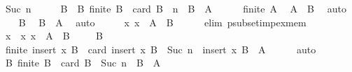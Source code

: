 \begin{isabellebody}
\ {\isacharparenleft}{\kern0pt}Suc\ n{\isacharparenright}{\kern0pt}\isanewline
\ \ \isamarkupfalse%
\ \isamarkupfalse%
\ B\ \ B{\isacharcolon}{\kern0pt}\ {\isachardoublequoteopen}finite\ B\ {\isasymand}\ card\ B\ {\isacharequal}{\kern0pt}\ n\ {\isasymand}\ B\ {\isasymsubseteq}\ A{\isachardoublequoteclose}\ \isacommand{{\isachardot}{\kern0pt}{\isachardot}{\kern0pt}}\isamarkupfalse%
\isanewline
\ \ \isamarkupfalse%
\ {\isacartoucheopen}{\isasymnot}\ finite\ A{\isacartoucheclose}\ \isamarkupfalse%
\ {\isachardoublequoteopen}A\ {\isasymnoteq}\ B{\isachardoublequoteclose}\ \isamarkupfalse%
\ auto\isanewline
\ \ \isamarkupfalse%
\ B\ \isamarkupfalse%
\ {\isachardoublequoteopen}B\ {\isasymsubset}\ A{\isachardoublequoteclose}\ \isamarkupfalse%
\ auto\isanewline
\ \ \isamarkupfalse%
\ \isamarkupfalse%
\ {\isachardoublequoteopen}{\isasymexists}x{\isachardot}{\kern0pt}\ x\ {\isasymin}\ A\ {\isacharminus}{\kern0pt}\ B{\isachardoublequoteclose}\isanewline
\ \ \ \ \isamarkupfalse%
\ {\isacharparenleft}{\kern0pt}elim\ psubset{\isacharunderscore}{\kern0pt}imp{\isacharunderscore}{\kern0pt}ex{\isacharunderscore}{\kern0pt}mem{\isacharparenright}{\kern0pt}\isanewline
\ \ \isamarkupfalse%
\ \isamarkupfalse%
\ x\ \ x{\isacharcolon}{\kern0pt}\ {\isachardoublequoteopen}x\ {\isasymin}\ A\ {\isacharminus}{\kern0pt}\ B{\isachardoublequoteclose}\ \isacommand{{\isachardot}{\kern0pt}{\isachardot}{\kern0pt}}\isamarkupfalse%
\isanewline
\ \ \isamarkupfalse%
\ B\ \isamarkupfalse%
\ {\isachardoublequoteopen}finite\ {\isacharparenleft}{\kern0pt}insert\ x\ B{\isacharparenright}{\kern0pt}\ {\isasymand}\ card\ {\isacharparenleft}{\kern0pt}insert\ x\ B{\isacharparenright}{\kern0pt}\ {\isacharequal}{\kern0pt}\ Suc\ n\ {\isasymand}\ insert\ x\ B\ {\isasymsubseteq}\ A{\isachardoublequoteclose}\isanewline
\ \ \ \ \isamarkupfalse%
\ auto\isanewline
\ \ \isamarkupfalse%
\ \isamarkupfalse%
\ {\isachardoublequoteopen}{\isasymexists}B{\isachardot}{\kern0pt}\ finite\ B\ {\isasymand}\ card\ B\ {\isacharequal}{\kern0pt}\ Suc\ n\ {\isasymand}\ B\ {\isasymsubseteq}\ A{\isachardoublequoteclose}\ \isacommand{{\isachardot}{\kern0pt}{\isachardot}{\kern0pt}}\isamarkupfalse%
\isanewline
{}\isamarkupfalse%
%
\endisatagproof
{\isafoldproof}%
%
\isadelimproof
%
\endisadelimproof

\end{isabellebody}
